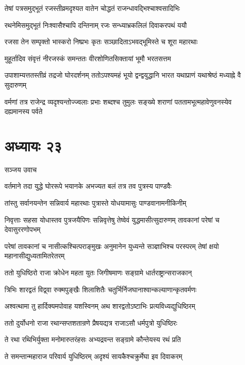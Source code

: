 \twolineshloka
{तेषां पत्रसमुद्भूतं रजस्तीव्रमदृश्यत}
{वातेन चोद्धतं राजन्धावद्भिश्चाश्वसादिभिः}


\twolineshloka
{रथनेमिसमुद्भूतं निःश्वासैश्चापि दन्तिनाम्}
{रजः सन्ध्याभ्रकलिलं दिवाकरपथं ययौ}


\twolineshloka
{रजसा तेन सम्पृक्तो भास्करो निष्प्रभः कृतः}
{सञ्छादिताऽभवद्भूमिस्ते च शूरा महारथाः}


\twolineshloka
{मुहूर्तादिव संवृत्तं नीरजस्कं समन्ततः}
{वीरशोणितसिक्तायां भूमौ भरतसत्तम}


उपाशाम्यत्ततस्तीव्रं तद्रजो घोरदर्शनम्
\twolineshloka
{ततोऽपश्यमहं भूयो द्वन्द्वयुद्धानि भारत}
{यथाप्राणं यथाश्रेष्ठं मध्याह्ने वै सुदारुणम्}


\twolineshloka
{वर्मणां तत्र राजेन्द्र व्यदृश्यन्तोज्ज्वलाः प्रभाः}
{शब्दश्च तुमुलः सङ्ख्ये शराणां पततामभूत्महावेणुवनस्येव दह्यमानस्य पर्वते}


\chapter{अध्यायः २३}
\twolineshloka
{सञ्जय उवाच}
{}


\twolineshloka
{वर्तमाने तदा युद्धे घोररूपे भयानके}
{अभज्यत बलं तत्र तव पुत्रस्य पाण्डवैः}


\twolineshloka
{तांस्तु सर्वानयन्तेन सन्निवार्य महारथाः}
{पुत्रास्ते योधयामासुः पाण्डवानामनीकिनीम्}


\threelineshloka
{निवृत्ताः सहसा योधास्तव पुत्रजयैपिणः}
{सन्निवृत्तेषु तेष्वेवं युद्धमासीत्सुदारुणम्}
{तावकानां परेषां च देवासुररणोपभम्}


परेषां तावकानां च नासीत्कश्चित्पराङ्मुखः
\twolineshloka
{अनुमानेन युध्यन्ते सञ्ज्ञाभिश्च परस्परम्}
{तेषां क्षयो महानासीद्युध्यतामितरेतरम्}


\twolineshloka
{ततो युधिष्ठिरो राजा क्रोधेन महता युतः}
{जिगीषमाणः सङ्ग्रामे धार्तराष्ट्रान्सराजकान्}


\twolineshloka
{त्रिभिः शारद्वतं विद्व्वा रुक्मपुङ्खैः शिलाशितैः}
{चतुर्भिर्निजघानाश्वान्कल्याणान्कृतवर्मणः}


\twolineshloka
{अश्वत्थामा तु हार्दिक्यमपोवाह यशस्विनम्}
{अथ शारद्वतोऽष्टाभिः प्रत्यविध्यद्युधिष्ठिरम्}


\twolineshloka
{ततो दुर्योधनो राजा रथान्सप्तशतान्रणे}
{प्रैषयद्यत्र राजाऽसौ धर्मपुत्रो युधिष्ठिरः}


\twolineshloka
{ते रथा रथिभिर्युक्ता मनोमारुतरंहसः}
{अभ्यद्रवन्त सङ्ग्रामे कौन्तेयस्य रथं प्रति}


\twolineshloka
{ते समन्तान्महाराज परिवार्य युधिष्ठिरम्}
{अदृश्यं सायकैश्चक्रुर्मेघा इव दिवाकरम्}


